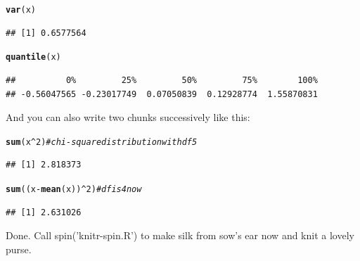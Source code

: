 \documentclass{article}\usepackage[]{graphicx}\usepackage[]{color}
\makeatletter
\newcommand{\hlnum}[1]{\textcolor[rgb]{0.686,0.059,0.569}{#1}}%
\newcommand{\hlcom}[1]{\textcolor[rgb]{0.678,0.584,0.686}{\textit{#1}}}%
\newcommand{\hlopt}[1]{\textcolor[rgb]{0,0,0}{#1}}%
\newcommand{\hlstd}[1]{\textcolor[rgb]{0.345,0.345,0.345}{#1}}%
\newcommand{\hlkwd}[1]{\textcolor[rgb]{0.737,0.353,0.396}{\textbf{#1}}}%
\newenvironment{kframe}{%
 \def\at@end@of@kframe{}%
 \ifinner\ifhmode%
  \def\at@end@of@kframe{\end{minipage}}%
  \begin{minipage}{\columnwidth}%
 \fi\fi%
 \def\FrameCommand##1{\hskip\@totalleftmargin \hskip-\fboxsep
 \colorbox{shadecolor}{##1}\hskip-\fboxsep
     \hskip-\linewidth \hskip-\@totalleftmargin \hskip\columnwidth}%
 \MakeFramed {\advance\hsize-\width
   \@totalleftmargin\z@ \linewidth\hsize
   \@setminipage}}%
 {\par\unskip\endMakeFramed%
 \at@end@of@kframe}
\newenvironment{knitrout}{}{} %
\makeatother
\begin{document}
{{\begin{knitrout}
\color{fgcolor}\begin{kframe}
\begin{alltt}
\hlkwd{var}\hlstd{(x)}
\end{alltt}
\begin{verbatim}
## [1] 0.6577564
\end{verbatim}
\begin{alltt}
\hlkwd{quantile}\hlstd{(x)}
\end{alltt}
\begin{verbatim}
##          0%         25%         50%         75%        100% 
## -0.56047565 -0.23017749  0.07050839  0.12928774  1.55870831
\end{verbatim}
\end{kframe}
\end{knitrout}

And you can also write two chunks successively like this:

\begin{knitrout}
\color{fgcolor}\begin{kframe}
\begin{alltt}
\hlkwd{sum}\hlstd{(x}\hlopt{^}\hlnum{2}\hlstd{)} \hlcom{# chi-square distribution with df 5}
\end{alltt}
\begin{verbatim}
## [1] 2.818373
\end{verbatim}
\end{kframe}
\end{knitrout}
\begin{knitrout}
\color{fgcolor}\begin{kframe}
\begin{alltt}
\hlkwd{sum}\hlstd{((x} \hlopt{-} \hlkwd{mean}\hlstd{(x))}\hlopt{^}\hlnum{2}\hlstd{)} \hlcom{# df is 4 now}
\end{alltt}
\begin{verbatim}
## [1] 2.631026
\end{verbatim}
\end{kframe}
\end{knitrout}

Done. Call spin('knitr-spin.R') to make silk from sow's ear now and knit a
lovely purse.
\end{document}
